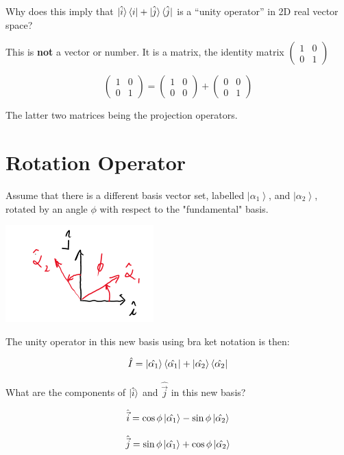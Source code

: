 \documentclass{article}
\begin{document}
Why does this imply that $\ket{\hat{i}} \bra{i} + \ket{\hat{j}} \bra{\hat{j}}$ is a “unity operator” in 2D real vector space?

This is \textbf{not} a vector or number. It is a matrix, the identity matrix $\begin{pmatrix} 1 & 0 \\ 0 & 1 \end{pmatrix}$

$$\begin{pmatrix} 1 & 0 \\ 0 & 1 \end{pmatrix} = \begin{pmatrix} 1 & 0 \\ 0 & 0 \end{pmatrix} + \begin{pmatrix} 0 & 0 \\ 0 & 1 \end{pmatrix}$$

The latter two matrices being the projection operators. 

\section{Rotation Operator}

Assume that there is a different basis vector set, labelled $\left|\alpha_{1}\right\rangle$, and $\left|\alpha_{2}\right\rangle$, rotated by an angle $\phi$ with respect to the "fundamental" basis.

\includegraphics[width = 0.3 \textwidth]{Lecture11/2.png}

The unity operator in this new basis using bra ket notation is then:

$$\hat{I} = \ket{\hat{\alpha_1}} \bra{\hat{\alpha_1}} + \ket{\hat{\alpha_2}} \bra{\hat{\alpha_2}}$$

What are the components of $\ket{\hat{i}}$ and $\hat{\vec{j}}$ in this new basis?

$$\hat{\vec{i}} = \cos \phi \ket{\hat{\alpha_1}} - \sin \phi \ket{\hat{\alpha_2}}$$

$$\hat{\vec{j}} = \sin \phi \ket{\hat{\alpha_1}} + \cos \phi \ket{\hat{\alpha_2}}$$
\end{document}
